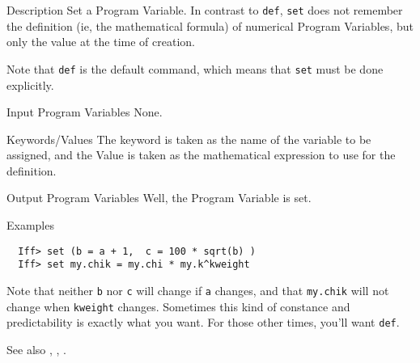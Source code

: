
\begin{IFFcom}
\item[Description] Set a Program Variable.  In contrast to {\tt{def}},
  {\tt{set}} does not remember the definition (ie, the mathematical
  formula) of numerical Program Variables, but only the value at the time
  of creation.
  
  Note that {\tt{def}} is the default command, which means that {\tt{set}}
  must be done explicitly.

\item[Input Program Variables] None.
\item[Keywords/Values]  The keyword is taken as the name of the variable to
  be assigned, and the Value is taken as the mathematical expression to use
  for the definition. 

\item[Output Program Variables] Well, the Program Variable is set. 
\item[Examples] {\hspace{1.in} \vspace{-0.1truein} \relax }
\begin{verbatim} 
  Iff> set (b = a + 1,  c = 100 * sqrt(b) )
  Iff> set my.chik = my.chi * my.k^kweight
\end{verbatim} \noindent %
  Note that neither {\tt{b}} nor {\tt{c}} will change if {\tt{a}} changes,
  and that {\tt{my.chik}} will not change when {\tt{kweight}} changes.
  Sometimes this kind of constance and predictability is exactly what you
  want.  For those other times, you'll want {\tt{def}}.
\item[See also] {}, {}, {}.
\end{IFFcom}




